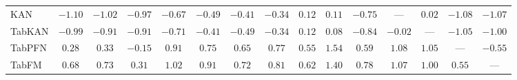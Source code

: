 \begin{table}[htbp]
\begin{tabular}{lcccccccccccccc}
KAN & $-1.10$ & $-1.02$ & $-0.97$ & $-0.67$ & $-0.49$ & $-0.41$ & $-0.34$ & $0.12$ & $0.11$ & $-0.75$ & --- & $0.02$ & $-1.08$ & $-1.07$ \\
TabKAN & $-0.99$ & $-0.91$ & $-0.91$ & $-0.71$ & $-0.41$ & $-0.49$ & $-0.34$ & $0.12$ & $0.08$ & $-0.84$ & $-0.02$ & --- & $-1.05$ & $-1.00$ \\
TabPFN & $0.28$ & $0.33$ & $-0.15$ & $0.91$ & $0.75$ & $0.65$ & $0.77$ & $0.55$ & $1.54$ & $0.59$ & $1.08$ & $1.05$ & --- & $-0.55$ \\
TabFM & $0.68$ & $0.73$ & $0.31$ & $1.02$ & $0.91$ & $0.72$ & $0.81$ & $0.62$ & $1.40$ & $0.78$ & $1.07$ & $1.00$ & $0.55$ & --- \\
\bottomrule
\end{tabular}
\end{table}

